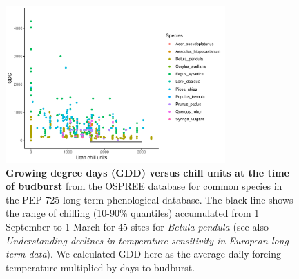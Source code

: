 \documentclass{article}
\begin{document}
\begin{figure}[h!]
\centering
\noindent \includegraphics[width=0.75\textwidth]{..//..//analyses/bb_analysis/figures/gddbyutah_pepspp.pdf}
\caption{\textbf{Growing degree days (GDD) versus chill units at the time of budburst} from the OSPREE database for common species in the PEP 725 long-term phenological database. The black line shows the range of chilling (10-90\% quantiles) accumulated from 1 September to 1 March for 45 sites for \emph{Betula pendula} (see also \emph{Understanding declines in temperature sensitivity in European long-term data}). We calculated GDD here as the average daily forcing temperature multiplied by days to budburst. }
\label{fig:pepgddchill}
\end{figure}
\newpage


\end{document}
